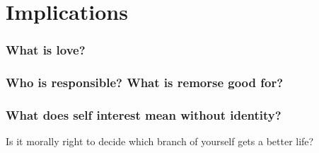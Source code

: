 \documentclass[11pt]{article}
\begin{document}
\section*{Implications}
\label{sec:org4369775}
\subsubsection*{What is love?}
\label{sec:org8333811}
\subsubsection*{Who is responsible? What is remorse good for?}
\label{sec:org5be5825}
\subsubsection*{What does self interest mean without identity?}
\label{sec:orgb98366e}
Is it morally right to decide which branch of yourself gets a better life?
\end{document}
